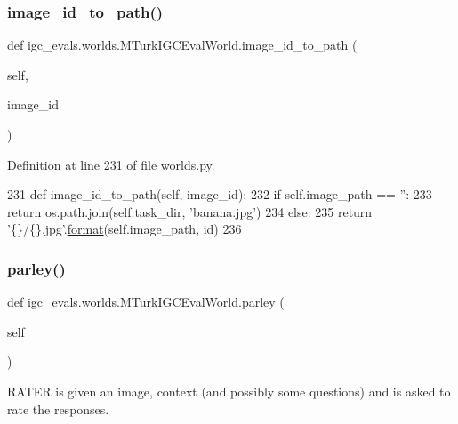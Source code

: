 \subsubsection{\texorpdfstring{image\+\_\+id\+\_\+to\+\_\+path()}{image\_id\_to\_path()}}
{\footnotesize\ttfamily def igc\+\_\+evals.\+worlds.\+M\+Turk\+I\+G\+C\+Eval\+World.\+image\+\_\+id\+\_\+to\+\_\+path (\begin{DoxyParamCaption}\item[{}]{self,  }\item[{}]{image\+\_\+id }\end{DoxyParamCaption})}



Definition at line 231 of file worlds.\+py.


\begin{DoxyCode}
231     \textcolor{keyword}{def }image\_id\_to\_path(self, image\_id):
232         \textcolor{keywordflow}{if} self.image\_path == \textcolor{stringliteral}{''}:
233             \textcolor{keywordflow}{return} os.path.join(self.task\_dir, \textcolor{stringliteral}{'banana.jpg'})
234         \textcolor{keywordflow}{else}:
235             \textcolor{keywordflow}{return} \textcolor{stringliteral}{'\{\}/\{\}.jpg'}.\hyperlink{namespaceparlai_1_1chat__service_1_1services_1_1messenger_1_1shared__utils_a32e2e2022b824fbaf80c747160b52a76}{format}(self.image\_path, id)
236 
\end{DoxyCode}
\mbox{\label{classigc__evals_1_1worlds_1_1MTurkIGCEvalWorld_ab2ddf25bf050e7f12d675dc910c04a3d}} 
\subsubsection{\texorpdfstring{parley()}{parley()}}
{\footnotesize\ttfamily def igc\+\_\+evals.\+worlds.\+M\+Turk\+I\+G\+C\+Eval\+World.\+parley (\begin{DoxyParamCaption}\item[{}]{self }\end{DoxyParamCaption})}

\begin{DoxyVerb}RATER is given an image, context (and possibly some questions) and is asked to
rate the responses.
\end{DoxyVerb}
 

